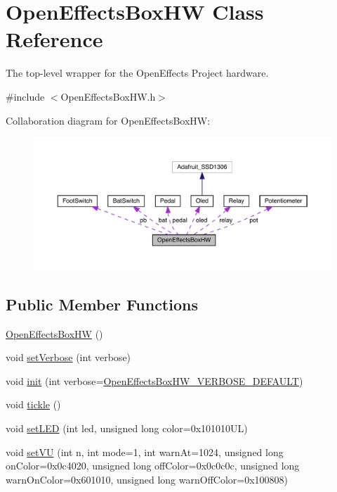 \hypertarget{class_open_effects_box_h_w}{}\section{Open\+Effects\+Box\+HW Class Reference}
\label{class_open_effects_box_h_w}


The top-\/level wrapper for the Open\+Effects Project hardware.  




{\ttfamily \#include $<$Open\+Effects\+Box\+H\+W.\+h$>$}



Collaboration diagram for Open\+Effects\+Box\+HW\+:
\nopagebreak
\begin{figure}[H]
\begin{center}
\leavevmode
\includegraphics[width=350pt]{class_open_effects_box_h_w__coll__graph}
\end{center}
\end{figure}
\subsection*{Public Member Functions}
\begin{DoxyCompactItemize}
\item 
\mbox{\hyperlink{class_open_effects_box_h_w_a5cfe531f432bc672dd08b45568bb09ec}{Open\+Effects\+Box\+HW}} ()
\item 
void \mbox{\hyperlink{class_open_effects_box_h_w_a23264e9f5d39eab721501b5a2bd3b190}{set\+Verbose}} (int verbose)
\item 
void \mbox{\hyperlink{class_open_effects_box_h_w_ac070397f7c596522c83c7ff1d540e2df}{init}} (int verbose=\mbox{\hyperlink{_open_effects_box_h_w_8h_ab5b85b536bb3e261f523db8c00ea9605}{Open\+Effects\+Box\+H\+W\+\_\+\+V\+E\+R\+B\+O\+S\+E\+\_\+\+D\+E\+F\+A\+U\+LT}})
\item 
void \mbox{\hyperlink{class_open_effects_box_h_w_a4623ed8f605ab7d6a4abedf6879f06ac}{tickle}} ()
\item 
void \mbox{\hyperlink{class_open_effects_box_h_w_a8bb57e4e28ba7012045ce7adaa15b78b}{set\+L\+ED}} (int led, unsigned long color=0x101010\+U\+L)
\item 
void \mbox{\hyperlink{class_open_effects_box_h_w_a9313d16771542c43c7782c19046caa8d}{set\+VU}} (int n, int mode=1, int warn\+At=1024, unsigned long on\+Color=0x0c4020, unsigned long off\+Color=0x0c0c0c, unsigned long warn\+On\+Color=0x601010, unsigned long warn\+Off\+Color=0x100808)
\end{DoxyCompactItemize}

